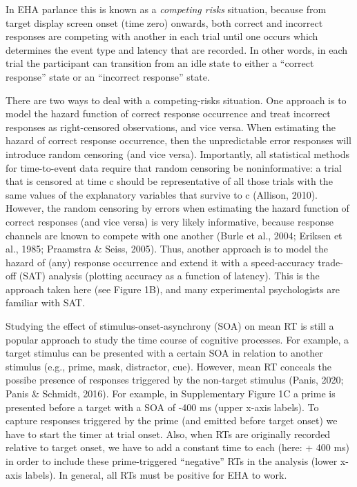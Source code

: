 \documentclass[
  man,floatsintext]{apa6}
\begin{document}
In EHA parlance this is known as a \emph{competing risks} situation, because from target display screen onset (time zero) onwards, both correct and incorrect responses are competing with another in each trial until one occurs which determines the event type and latency that are recorded. In other words, in each trial the participant can transition from an idle state to either a ``correct response'' state or an ``incorrect response'' state.

There are two ways to deal with a competing-risks situation. One approach is to model the hazard function of correct response occurrence and treat incorrect responses as right-censored observations, and vice versa. When estimating the hazard of correct response occurrence, then the unpredictable error responses will introduce random censoring (and vice versa). Importantly, all statistical methods for time-to-event data require that random censoring be noninformative: a trial that is censored at time c should be representative of all those trials with the same values of the explanatory variables that survive to c (Allison, 2010). However, the random censoring by errors when estimating the hazard function of correct responses (and vice versa) is very likely informative, because response channels are known to compete with one another (Burle et al., 2004; Eriksen et al., 1985; Praamstra \& Seiss, 2005). Thus, another approach is to model the hazard of (any) response occurrence and extend it with a speed-accuracy trade-off (SAT) analysis (plotting accuracy as a function of latency). This is the approach taken here (see Figure 1B), and many experimental psychologists are familiar with SAT.

Studying the effect of stimulus-onset-asynchrony (SOA) on mean RT is still a popular approach to study the time course of cognitive processes. For example, a target stimulus can be presented with a certain SOA in relation to another stimulus (e.g., prime, mask, distractor, cue). However, mean RT conceals the possibe presence of responses triggered by the non-target stimulus (Panis, 2020; Panis \& Schmidt, 2016). For example, in Supplementary Figure 1C a prime is presented before a target with a SOA of -400 ms (upper x-axis labels). To capture responses triggered by the prime (and emitted before target onset) we have to start the timer at trial onset. Also, when RTs are originally recorded relative to target onset, we have to add a constant time to each (here: + 400 ms) in order to include these prime-triggered ``negative'' RTs in the analysis (lower x-axis labels). In general, all RTs must be positive for EHA to work.
\end{document}
